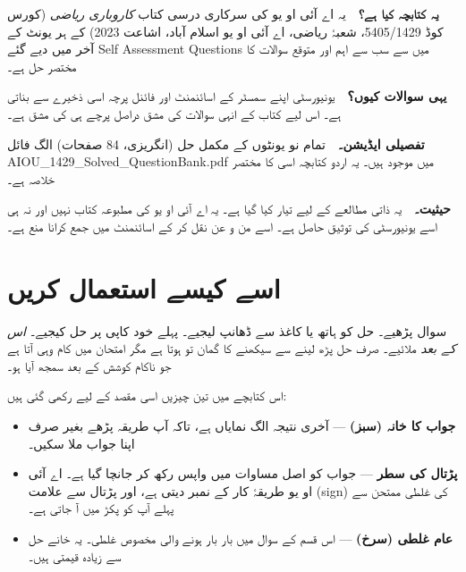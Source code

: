 \begin{tcolorbox}[enhanced, colback=bmtint, colframe=bmblue, boxrule=0.6pt,
                  arc=3pt, left=14pt, right=14pt, top=12pt, bottom=12pt]
\textbf{\color{bmblue}یہ کتابچہ کیا ہے؟}\ \
یہ اے آئی او یو کی سرکاری درسی کتاب \emph{کاروباری ریاضی} (کورس کوڈ
\textenglish{5405/1429}، شعبۂ ریاضی، اے آئی او یو اسلام آباد، اشاعت
\textenglish{2023}) کے ہر یونٹ کے آخر میں دیے گئے
\textenglish{Self Assessment Questions} میں سے سب سے اہم اور متوقع سوالات کا
مختصر حل ہے۔

\medskip
\textbf{\color{bmblue}یہی سوالات کیوں؟}\ \
یونیورسٹی اپنے سمسٹر کے اسائنمنٹ اور فائنل پرچہ اسی ذخیرے سے بناتی ہے۔ اس لیے
کتاب کے انہی سوالات کی مشق دراصل پرچے ہی کی مشق ہے۔

\medskip
\textbf{\color{bmblue}تفصیلی ایڈیشن۔}\ \
تمام نو یونٹوں کے مکمل حل (انگریزی، \textenglish{84} صفحات) الگ فائل
\textenglish{AIOU\_1429\_Solved\_QuestionBank.pdf} میں موجود ہیں۔ یہ اردو
کتابچہ اسی کا مختصر خلاصہ ہے۔

\medskip
\textbf{\color{bmblue}حیثیت۔}\ \
یہ ذاتی مطالعے کے لیے تیار کیا گیا ہے۔ یہ اے آئی او یو کی مطبوعہ کتاب نہیں اور
نہ ہی اسے یونیورسٹی کی توثیق حاصل ہے۔ اسے من و عن نقل کر کے اسائنمنٹ میں جمع
کرانا منع ہے۔
\end{tcolorbox}

\clearpage

\section*{اسے کیسے استعمال کریں}

سوال پڑھیے۔ حل کو ہاتھ یا کاغذ سے ڈھانپ لیجیے۔ پہلے خود کاپی پر حل کیجیے۔
\emph{اس کے بعد} ملائیے۔ صرف حل پڑھ لینے سے سیکھنے کا گمان تو ہوتا ہے مگر
امتحان میں کام وہی آتا ہے جو ناکام کوشش کے بعد سمجھ آیا ہو۔

\medskip
اس کتابچے میں تین چیزیں اسی مقصد کے لیے رکھی گئی ہیں:

\begin{itemize}
  \item \textbf{جواب کا خانہ (سبز)} --- آخری نتیجہ الگ نمایاں ہے، تاکہ آپ
        طریقہ پڑھے بغیر صرف اپنا جواب ملا سکیں۔
  \item \textbf{پڑتال کی سطر} --- جواب کو اصل مساوات میں واپس رکھ کر جانچا گیا
        ہے۔ اے آئی او یو طریقۂ کار کے نمبر دیتی ہے، اور پڑتال سے علامت
        (\textenglish{sign}) کی غلطی ممتحن سے پہلے آپ کو پکڑ میں آ جاتی ہے۔
  \item \textbf{عام غلطی (سرخ)} --- اس قسم کے سوال میں بار بار ہونے والی مخصوص
        غلطی۔ یہ خانے حل سے زیادہ قیمتی ہیں۔
\end{itemize}

